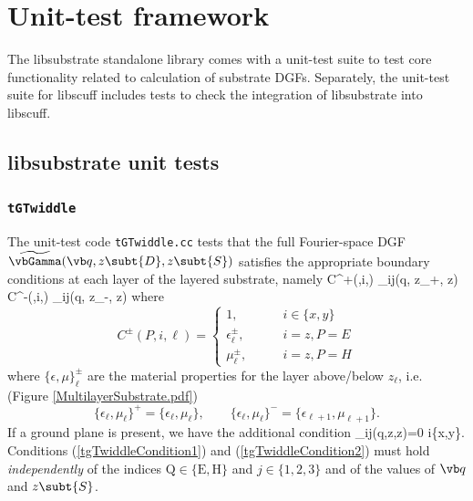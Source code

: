 \documentclass[letterpaper]{article}
\renewcommand{\wt}{\widetilde}
\begin{document}
\section{Unit-test framework}

The {\sc libsubstrate} standalone library comes with
a unit-test suite to test core functionality related
to calculation of substrate DGFs. Separately, the
unit-test suite for {\sc libscuff} includes tests
to check the integration of {\sc libsubstrate} 
into {\sc libscuff}.

\subsection{{\sc libsubstrate} unit tests}

\subsubsection{\texttt{tGTwiddle}}

The unit-test code \texttt{tGTwiddle.cc} tests that the full
Fourier-space DGF $\wt \vbGamma(\vb q, z\subt{D}, z\subt{S})$ satisfies the appropriate
boundary conditions at each layer of the layered substrate, namely
{ C^+(,i,\ell) \wt{\Gamma}_{ij}(\vb q, z_\ell+\eta, z)
   C^-(,i,\ell) \wt{\Gamma}_{ij}(\vb q, z_\ell-\eta, z)
}
where
$$ C^\pm(P, i, \ell)=
   \begin{cases}
    1, \qquad                 &i \in \{x,y\} \\
    \epsilon_\ell^\pm, \qquad &i=z, P=E \\
    \mu_\ell^\pm,      \qquad &i=z, P=H
   \end{cases}
$$
where $\{\epsilon,\mu\}_\ell^\pm$ are the
material properties for the layer above/below $z_\ell$, i.e.
(Figure \ref{MultilayerSubstrate.pdf})
$$ \{\epsilon_\ell, \mu_\ell\}^+ = \{\epsilon_\ell, \mu_\ell\},
   \qquad
   \{\epsilon_\ell, \mu_\ell\}^- = \{\epsilon_{\ell+1}, \mu_{\ell+1}\}.
$$
If a ground plane is present, we have the additional condition
{\wt{\Gamma}_{ij}(q,z,z)=0  i\in \{x,y\}.}
Conditions (\ref{tgTwiddleCondition1}) and (\ref{tgTwiddleCondition2})
must hold \textit{independently} of the indices $\text{Q}\in\{\text{E},\text{H}\}$
and $j\in\{1,2,3\}$ and of the values of $\vb q$ and $z\subt{S}$.
\end{document}

